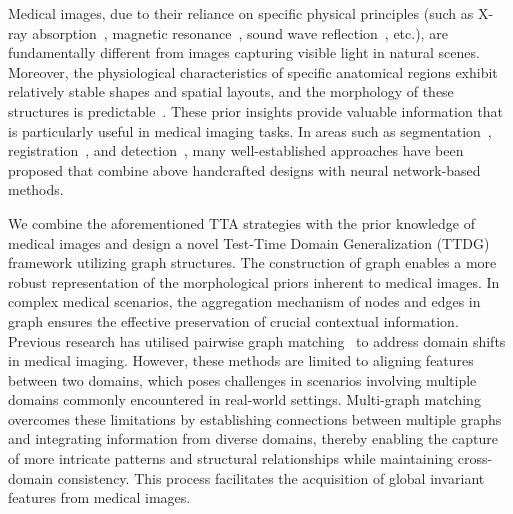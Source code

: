 
Medical images, due to their reliance on specific physical principles (such as X-ray absorption~\cite{de2001high}, magnetic resonance~\cite{slichter2013principles}, sound wave reflection~\cite{ter2007therapeutic}, etc.), are fundamentally different from images capturing visible light in natural scenes. Moreover, the physiological characteristics of specific anatomical regions exhibit relatively stable shapes and spatial layouts, and the morphology of these structures is predictable~\cite{pu2024m3,pmlr-v235-pu24b}. These prior insights provide valuable information that is particularly useful in medical imaging tasks. 
In areas such as segmentation~\cite{yang2023graphecho,liu2022single}, registration~\cite{kim2022diffusemorph}, and detection~\cite{pu2024m3,pmlr-v235-pu24b}, many well-established approaches have been proposed that combine above handcrafted designs with neural network-based methods.

We combine the aforementioned TTA strategies with the prior knowledge of medical images and design a novel Test-Time Domain Generalization (TTDG) framework utilizing graph structures.
The construction of graph enables a more robust representation of the morphological priors inherent to medical images. In complex medical scenarios, the aggregation mechanism of nodes and edges in graph ensures the effective preservation of crucial contextual information. Previous research has utilised pairwise graph matching~\cite{li2023sigma++,sarlin2020superglue,pu2024m3} to address domain shifts in medical imaging. However, these methods are limited to aligning features between two domains, which poses challenges in scenarios involving multiple domains commonly encountered in real-world settings. Multi-graph matching overcomes these limitations by establishing connections between multiple graphs and integrating information from diverse domains, thereby enabling the capture of more intricate patterns and structural relationships while maintaining cross-domain consistency. This process facilitates the acquisition of global invariant features from medical images.

